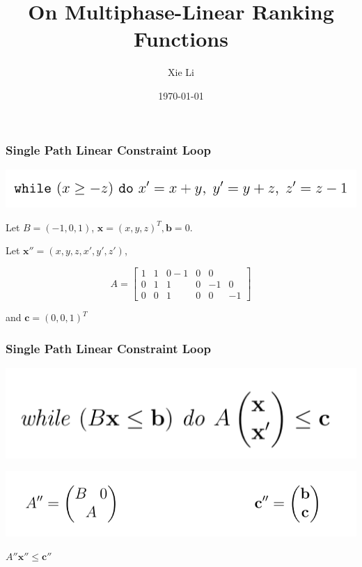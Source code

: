 \documentclass[11pt]{beamer}
\title{On Multiphase-Linear Ranking Functions}
\date{\today}
\author{Xie Li}
\begin{document}
\maketitle


\begin{frame}\frametitle{Single Path Linear Constraint Loop}
\begin{example}
\begin{center}

\includegraphics[scale = 0.4]{loopExample.png}


\end{center}
Let $B = (-1, 0, 1)$, $\textbf{x} = (x, y, z)^T, \textbf{b} = 0$.

Let $\textbf{x}'' = (x, y, z, x', y', z')$, 

\begin{equation}
A = \left[
\begin{array}{cccccc}
     1 &1 &0 -1 & 0 & 0 \\
     0 & 1 & 1 & 0 & -1 & 0 \\
     0& 0 & 1 & 0 & 0 & -1
\end{array}
\right]
\end{equation}

and $\textbf{c} = (0, 0, 1)^T$
\end{example}




\end{frame}
\begin{frame}\frametitle{Single Path Linear Constraint Loop}
\begin{definition}[SLC]
\includegraphics[scale = 0.4]{1.PNG}


\end{definition}
\begin{center}
\includegraphics[scale = 0.35]{2.PNG}

$A''\textbf{x}'' \le \textbf{c}''$
\end{center}
\end{frame}
\end{document}
